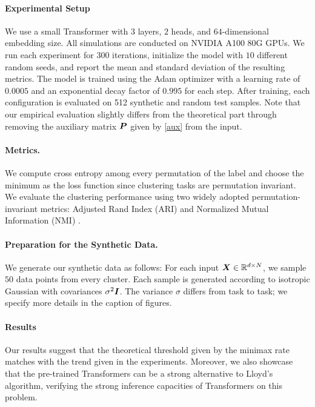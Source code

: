 \paragraph{Experimental Setup}
We use a small Transformer with $3$ layers, $2$ heads, and $64$-dimensional embedding size.
All simulations are conducted on NVIDIA A100 80G GPUs. We run each experiment for 300 iterations, initialize the model with $10$ different random seeds, and report the mean and standard deviation of the resulting metrics. The model is trained using the Adam optimizer with a learning rate of $0.0005$ and an exponential decay factor of $0.995$ for each step.
After training, each configuration is evaluated on 512 synthetic and random test samples. Note that our empirical evaluation slightly differs from the theoretical part through removing the auxiliary matrix $\boldsymbol{P}$ given by \eqref{aux} from the input.

\paragraph{Metrics.}
We compute cross entropy among every permutation of the label and choose the minimum as the loss function since clustering tasks are permutation invariant.
We evaluate the clustering performance using two widely adopted permutation-invariant metrics: Adjusted Rand Index (ARI) and Normalized Mutual Information (NMI) \citep{ma2019learning, huang2020partially, monnier2020deep, sun2024lsenet, li2024image}.


\paragraph{Preparation for the Synthetic Data.}
{We generate our synthetic data as follows: For each input $\boldsymbol{X} \in \mathbb{R}^{d \times N}$, we sample $50$ data points from every cluster. 
Each sample is generated according to isotropic Gaussian with covariances $\sigma^2 \boldsymbol{I}$.
The variance $\sigma$ differs from task to task; we specify more details in the caption of figures.}

\paragraph{Results}
Our results suggest that the theoretical threshold given by the minimax rate matches with the trend given in the experiments. Moreover, we also showcase that the pre-trained Transformers can be a strong alternative to Lloyd's algorithm, verifying the strong inference capacities of Transformers on this problem.




